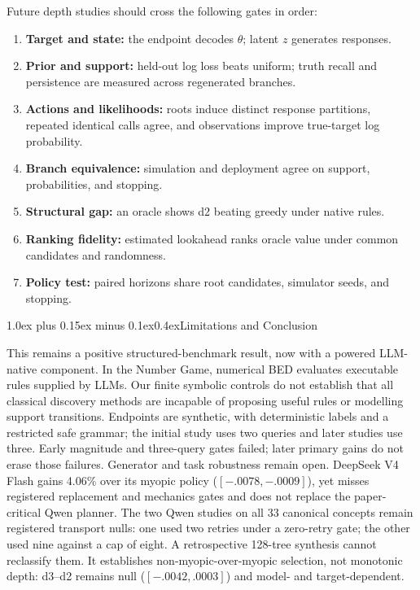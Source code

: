 \documentclass[10pt]{article}
\makeatletter
\renewcommand\section{\@startsection{section}{1}{0pt}%
  {1.0ex plus 0.15ex minus 0.1ex}{0.4ex}{\normalfont\Large\bfseries}}
\makeatother
\begin{document}
Future depth studies should cross the following gates in order:
\begin{enumerate}
  \setlength{\itemsep}{0.15em}
  \setlength{\topsep}{0.25em}
  \setlength{\parsep}{0pt}
  \item \textbf{Target and state:} the endpoint decodes $\theta$; latent $z$ generates responses.
  \item \textbf{Prior and support:} held-out log loss beats uniform; truth recall and persistence are measured across regenerated branches.
  \item \textbf{Actions and likelihoods:} roots induce distinct response partitions, repeated identical calls agree, and observations improve true-target log probability.
  \item \textbf{Branch equivalence:} simulation and deployment agree on support, probabilities, and stopping.
  \item \textbf{Structural gap:} an oracle shows d2 beating greedy under native rules.
  \item \textbf{Ranking fidelity:} estimated lookahead ranks oracle value under common candidates and randomness.
  \item \textbf{Policy test:} paired horizons share root candidates, simulator seeds, and stopping.
\end{enumerate}

\section{Limitations and Conclusion}

This remains a positive structured-benchmark result, now with a powered
LLM-native component. In the Number Game, numerical BED evaluates executable
rules supplied by LLMs. Our finite symbolic controls do not establish that all
classical discovery methods are incapable of proposing useful rules or modelling
support transitions. Endpoints are synthetic, with deterministic labels and a
restricted safe grammar; the initial study uses two queries and later studies
use three. Early magnitude and three-query gates failed; later primary gains
do not erase those failures. Generator and task robustness remain open.
DeepSeek V4 Flash gains 4.06\% over its myopic policy
($[-.0078,-.0009]$), yet misses registered replacement and mechanics gates and
does not replace the paper-critical Qwen planner.
The two Qwen studies on all 33 canonical concepts
\citep{tenenbaum2001generalization} remain registered transport nulls: one
used two retries under a zero-retry gate; the other used nine against a cap of
eight. A retrospective 128-tree synthesis cannot reclassify them. It establishes
non-myopic-over-myopic selection, not monotonic depth: d3--d2 remains null
($[-.0042,.0003]$) and model- and target-dependent.
\end{document}
